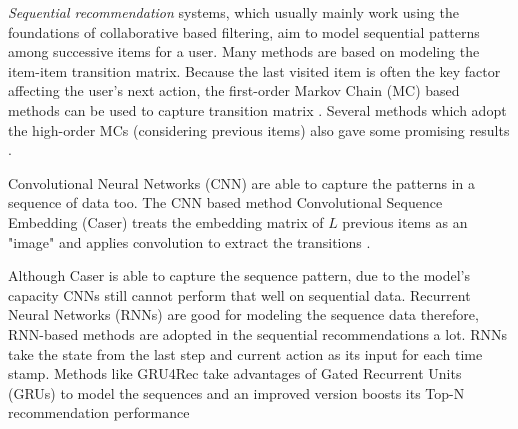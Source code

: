 \documentclass{bioinfo}
\begin{document}

\textit{Sequential recommendation} systems, which usually mainly work using the foundations of collaborative based filtering, aim to model sequential patterns among successive items for a user. Many methods are based on modeling the item-item transition matrix. Because the last visited item is often the key factor affecting the user's next action, the first-order Markov Chain (MC) based methods can be used to capture transition matrix \citep{MC_based_rec}. Several methods which adopt the high-order MCs (considering previous items) also gave some promising results \citep{High_order_MC_Rec}.

Convolutional Neural Networks (CNN) are able to capture the patterns in a sequence of data too. The CNN based method Convolutional Sequence Embedding (Caser) treats the embedding matrix of $L$ previous items as an "image" and applies convolution to extract the transitions \citep{Caser}. 

Although Caser is able to capture the sequence pattern, due to the model's capacity CNNs still cannot perform that well on sequential data. Recurrent Neural Networks (RNNs) are good for modeling the sequence data therefore, RNN-based methods are adopted in the sequential recommendations a lot. RNNs take the state from the last step and current action as its input for each time stamp. Methods like GRU4Rec \citep{GRU4Rec} take advantages of Gated Recurrent Units (GRUs) to model the sequences and an improved version boosts its Top-N recommendation performance \citep{Top_K_Booster_GRU}

\end{document}
